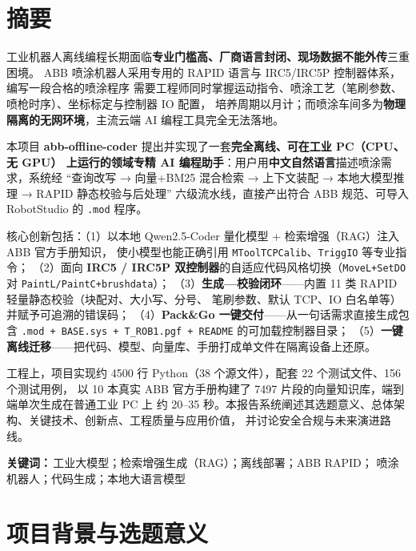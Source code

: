 \documentclass[12pt,a4paper,fontset=none]{ctexart}
\begin{document}
\section*{摘要}
\noindent
工业机器人离线编程长期面临\textbf{专业门槛高、厂商语言封闭、现场数据不能外传}三重困境。
ABB 喷涂机器人采用专用的 RAPID 语言与 IRC5/IRC5P 控制器体系，编写一段合格的喷涂程序
需要工程师同时掌握运动指令、喷涂工艺（笔刷参数、喷枪时序）、坐标标定与控制器 IO 配置，
培养周期以月计；而喷涂车间多为\textbf{物理隔离的无网环境}，主流云端 AI 编程工具完全无法落地。

本项目 \textbf{abb-offline-coder} 提出并实现了一套\textbf{完全离线、可在工业 PC（CPU、无 GPU）
上运行的领域专精 AI 编程助手}：用户用\textbf{中文自然语言}描述喷涂需求，系统经
“查询改写 → 向量+BM25 混合检索 → 上下文装配 → 本地大模型推理 → RAPID 静态校验与后处理”
六级流水线，直接产出符合 ABB 规范、可导入 RobotStudio 的 \texttt{.mod} 程序。

核心创新包括：（1）以本地 Qwen2.5-Coder 量化模型 + 检索增强（RAG）注入 ABB 官方手册知识，
使小模型也能正确引用 \texttt{MToolTCPCalib}、\texttt{TriggIO} 等专业指令；
（2）面向 \textbf{IRC5 / IRC5P 双控制器}的自适应代码风格切换（\texttt{MoveL+SetDO}
对 \texttt{PaintL/PaintC+brushdata}）；
（3）\textbf{生成—校验闭环}——内置 11 类 RAPID 轻量静态校验（块配对、大小写、分号、
笔刷参数、默认 TCP、IO 白名单等）并赋予可追溯的错误码；
（4）\textbf{Pack\&Go 一键交付}——从一句话需求直接生成包含
\texttt{.mod + BASE.sys + T\_ROB1.pgf + README} 的可加载控制器目录；
（5）\textbf{一键离线迁移}——把代码、模型、向量库、手册打成单文件在隔离设备上还原。

工程上，项目实现约 4500 行 Python（38 个源文件），配套 22 个测试文件、156 个测试用例，
以 10 本真实 ABB 官方手册构建了 7497 片段的向量知识库，端到端单次生成在普通工业 PC 上
约 20--35 秒。本报告系统阐述其选题意义、总体架构、关键技术、创新点、工程质量与应用价值，
并讨论安全合规与未来演进路线。

\vspace{4pt}
\noindent\textbf{关键词：}\,工业大模型；检索增强生成（RAG）；离线部署；ABB RAPID；
喷涂机器人；代码生成；本地大语言模型

\newpage
\tableofcontents
\newpage

\section{项目背景与选题意义}
\end{document}
